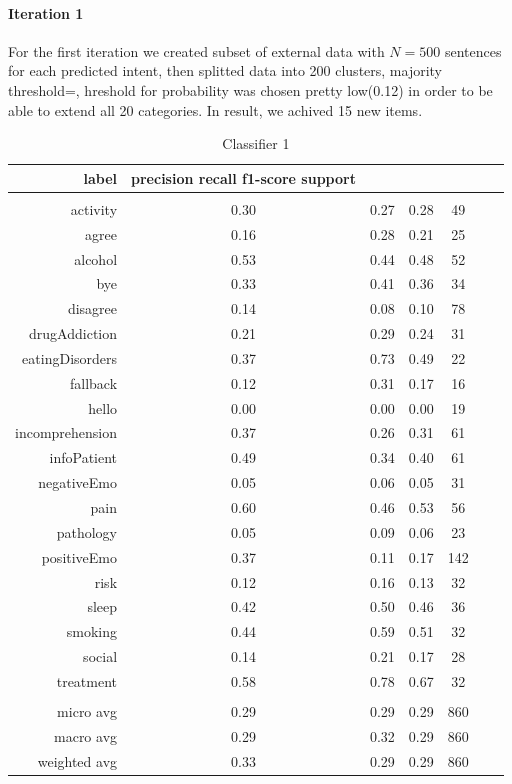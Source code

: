 \documentclass[11pt]{article}
\begin{document}
\paragraph{Iteration 1} For the first iteration we created subset of external data with $N=500$ sentences for each predicted intent, then splitted data into 200 clusters, majority threshold=, hreshold for probability was chosen pretty low(0.12) in order to be able to extend all 20 categories. In result, we achived 15 new items.

\begin{table}[htb]
\begin{center}
\begin{tabular}{ |r|c|c|c|c|c|c| }
label & precision    recall  f1-score   support\\ \hline 
\\ \hline 
activity &  0.30 & 0.27 & 0.28 &   49\\ \hline 
agree &  0.16 & 0.28 & 0.21 &   25\\ \hline 
alcohol &  0.53 & 0.44 & 0.48 &   52\\ \hline 
bye &  0.33 & 0.41 & 0.36 &   34\\ \hline 
disagree &  0.14 & 0.08 & 0.10 &   78\\ \hline 
drugAddiction &  0.21 & 0.29 & 0.24 &   31\\ \hline 
eatingDisorders &  0.37 & 0.73 & 0.49 &   22\\ \hline 
fallback &  0.12 & 0.31 & 0.17 &   16\\ \hline 
hello &  0.00 & 0.00 & 0.00 &   19\\ \hline 
incomprehension &  0.37 & 0.26 & 0.31 &   61\\ \hline 
infoPatient &  0.49 & 0.34 & 0.40 &   61\\ \hline 
negativeEmo &  0.05 & 0.06 & 0.05 &   31\\ \hline 
pain &  0.60 & 0.46 & 0.53 &   56\\ \hline 
pathology &  0.05 & 0.09 & 0.06 &   23\\ \hline 
positiveEmo &  0.37 & 0.11 & 0.17 &  142\\ \hline 
risk &  0.12 & 0.16 & 0.13 &   32\\ \hline 
sleep &  0.42 & 0.50 & 0.46 &   36\\ \hline 
smoking &  0.44 & 0.59 & 0.51 &   32\\ \hline 
social &  0.14 & 0.21 & 0.17 &   28\\ \hline 
treatment &  0.58 & 0.78 & 0.67 &   32\\ \hline 
\\ \hline 
micro avg &  0.29 & 0.29 & 0.29 &  860\\ \hline 
macro avg &  0.29 & 0.32 & 0.29 &  860\\ \hline 
weighted avg &  0.33 & 0.29 & 0.29 &  860\\ \hline
\end{tabular}
\caption{Classifier 1}
\end{center}
\end{table}
\FloatBarrier
\end{document}

